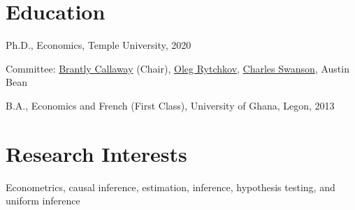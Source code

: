 \documentclass[12pt,letterpaper]{article}
\renewenvironment{itemize}{
  \begin{list}{}{
    \setlength{\leftmargin}{1.5em}
  }
}{
  \end{list}
}
\begin{document}
\section*{Education}

\begin{itemize}
  \item Ph.D., Economics, Temple University, 2020
  \begin{itemize}
  \item Committee: \href{https://bcallaway11.github.io/index.html}{Brantly Callaway} (Chair), \href{https://astro.temple.edu/~rytchkov/}{Oleg Rytchkov}, \href{https://liberalarts.temple.edu/academics/faculty/swanson-charles}{Charles Swanson}, Austin Bean
  \end{itemize}

  \item B.A., Economics and French (First Class), University of Ghana, Legon, 2013
\end{itemize}

\section*{Research Interests}
\begin{itemize}
  \item Econometrics, causal inference, estimation, inference, hypothesis testing, and uniform inference
\end{itemize}
\end{document}
